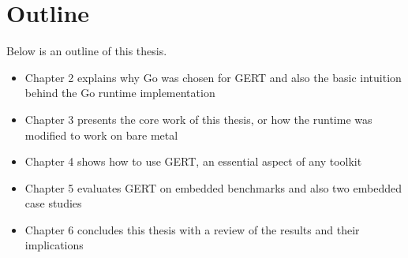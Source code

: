 \section{Outline}
Below is an outline of this thesis.
\begin{itemize}
  \item Chapter 2 explains why Go was chosen for GERT and also the basic intuition behind the Go runtime implementation
  \item Chapter 3 presents the core work of this thesis, or how the runtime was modified to work on bare metal
  \item Chapter 4 shows how to use GERT, an essential aspect of any toolkit
  \item Chapter 5 evaluates GERT on embedded benchmarks and also two embedded case studies
  \item Chapter 6 concludes this thesis with a review of the results and their implications
\end{itemize}
